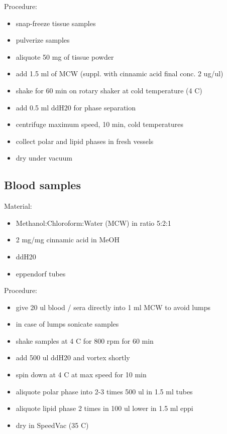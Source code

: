 \documentclass[]{book}
\providecommand{\tightlist}{%
  \setlength{\itemsep}{0pt}\setlength{\parskip}{0pt}}
\theoremstyle{definition}
\theoremstyle{definition}
\theoremstyle{definition}
\theoremstyle{remark}
\begin{document}
Procedure:

\begin{itemize}
\tightlist
\item
  snap-freeze tissue samples
\item
  pulverize samples
\item
  aliquote 50 mg of tissue powder
\item
  add 1.5 ml of MCW (suppl. with cinnamic acid final conc. 2 ug/ul)
\item
  shake for 60 min on rotary shaker at cold temperature (4 C)
\item
  add 0.5 ml ddH20 for phase separation
\item
  centrifuge maximum speed, 10 min, cold temperatures
\item
  collect polar and lipid phases in fresh vessels
\item
  dry under vacuum
\end{itemize}

\subsection{Blood samples}\label{blood-samples}

Material:

\begin{itemize}
\tightlist
\item
  Methanol:Chloroform:Water (MCW) in ratio 5:2:1
\item
  2 mg/mg cinnamic acid in MeOH
\item
  ddH20
\item
  eppendorf tubes
\end{itemize}

Procedure:

\begin{itemize}
\tightlist
\item
  give 20 ul blood / sera directly into 1 ml MCW to avoid lumps
\item
  in case of lumps sonicate samples
\item
  shake samples at 4 C for 800 rpm for 60 min
\item
  add 500 ul ddH20 and vortex shortly
\item
  spin down at 4 C at max speed for 10 min
\item
  aliquote polar phase into 2-3 times 500 ul in 1.5 ml tubes
\item
  aliquote lipid phase 2 times in 100 ul lower in 1.5 ml eppi
\item
  dry in SpeedVac (35 C)
\end{itemize}
\end{document}
